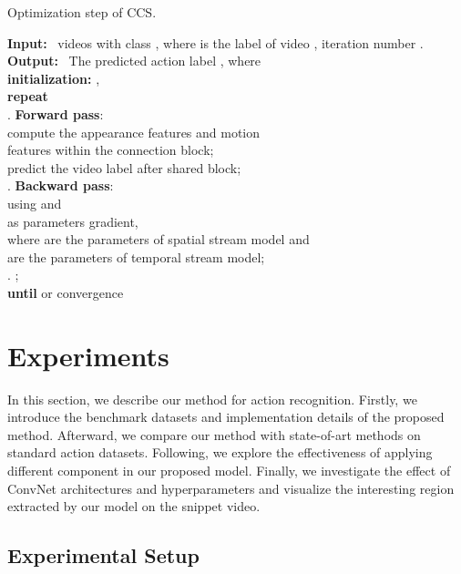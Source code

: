 \documentclass[conference,compsoc]{IEEEtran}
\begin{document}
\begin{algorithm}[h]
    \caption{Optimization step of CCS.}
\begin{algorithmic}
    \STATE \textbf{Input:}~  videos with  class , where  is the label of video , iteration number .
    \STATE \textbf{Output:}~ The predicted action label , where  \\
    \STATE \textbf{initialization:} ,\\
    \STATE \textbf{repeat}\\
\quad {}. \textbf{Forward pass}: \\
\quad \quad {} compute the appearance features  and motion \\
\quad \quad \quad   features  within the connection block;\\
\quad \quad {} predict the video label  after shared block;\\
\quad {}. \textbf{Backward pass}:\\
\quad \quad \quad using  and\\
\quad \quad \quad  as parameters gradient,\\
\quad \quad \quad where  are the parameters of spatial stream model and \\
\quad \quad \quad  are the parameters of temporal stream model;\\
\quad {}. ;\\
\STATE \textbf{until}  or convergence
\end{algorithmic}
\label{algo:1}
\end{algorithm}

\section{Experiments}
\label{S:4}

In this section, we describe our method for action recognition. Firstly, we introduce the benchmark datasets and implementation details of the proposed method. Afterward, we compare our method with state-of-art methods on standard action datasets. Following, we explore the effectiveness of applying different component in our proposed model. Finally, we investigate the effect of ConvNet architectures and hyperparameters and visualize the interesting region extracted by our model on the snippet video.

\subsection{Experimental Setup}
\end{document}
